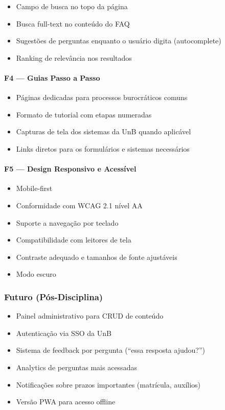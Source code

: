 \documentclass[12pt, a4paper]{article}
\begin{document}
\begin{itemize}
  \item Campo de busca no topo da página
  \item Busca full-text no conteúdo do FAQ
  \item Sugestões de perguntas enquanto o usuário digita (autocomplete)
  \item Ranking de relevância nos resultados
\end{itemize}

\paragraph{F4 — Guias Passo a Passo}

\begin{itemize}
  \item Páginas dedicadas para processos burocráticos comuns
  \item Formato de tutorial com etapas numeradas
  \item Capturas de tela dos sistemas da UnB quando aplicável
  \item Links diretos para os formulários e sistemas necessários
\end{itemize}

\paragraph{F5 — Design Responsivo e Acessível}

\begin{itemize}
  \item Mobile-first
  \item Conformidade com WCAG 2.1 nível AA
  \item Suporte a navegação por teclado
  \item Compatibilidade com leitores de tela
  \item Contraste adequado e tamanhos de fonte ajustáveis
  \item Modo escuro
\end{itemize}

\subsubsection{Futuro (Pós-Disciplina)}

\begin{itemize}
  \item Painel administrativo para CRUD de conteúdo
  \item Autenticação via SSO da UnB
  \item Sistema de feedback por pergunta (``essa resposta ajudou?'')
  \item Analytics de perguntas mais acessadas
  \item Notificações sobre prazos importantes (matrícula, auxílios)
  \item Versão PWA para acesso offline
\end{itemize}
\end{document}
